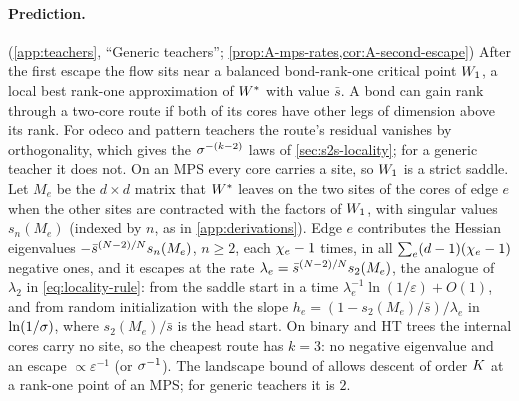 \paragraph{Prediction.}
\derived{} \newresult{} (\cref{app:teachers}, ``Generic teachers''; \cref{prop:A-mps-rates,cor:A-second-escape})
After the first escape the flow sits near a balanced bond-rank-one critical point $W_1$, a local best
rank-one approximation of $W^{*}$ with value $\bar s$. A bond can gain rank through a two-core route if both of
its cores have other legs of dimension above its rank. For odeco and pattern teachers the route's
residual vanishes by orthogonality, which gives the $\sigma^{-(k-2)}$ laws of \cref{sec:s2s-locality}; for a
generic teacher it does not. On an MPS every core carries a site, so $W_1$ is a strict saddle. Let $M_e$
be the $d\times d$ matrix that $W^{*}$ leaves on the two sites of the cores of edge $e$ when the other sites
are contracted with the factors of $W_1$, with singular values $s_n(M_e)$ (indexed by $n$, as in \cref{app:derivations}). Edge $e$ contributes the Hessian
eigenvalues $-\bar s^{(N-2)/N}s_n(M_e)$, $n\ge2$, each $\chi_{e}-1$ times, in all $\sum_e(d-1)(\chi_{e}-1)$ negative
ones, and it escapes at the rate $\lambda_e=\bar s^{(N-2)/N}s_2(M_e)$, the analogue of $\lambda_2$ in
\eqref{eq:locality-rule}: from the saddle start in a time $\lambda_e^{-1}\ln(1/\varepsilon)+O(1)$, and from random
initialization with the slope $h_e=(1-s_2(M_e)/\bar s)/\lambda_e$ in $\ln(1/\sigma)$, where $s_2(M_e)/\bar s$ is the head
start. On binary and HT trees the internal cores carry no site, so the cheapest route has $k=3$: no
negative eigenvalue and an escape $\propto\varepsilon^{-1}$ (or $\sigma^{-1}$). The landscape bound of
\citet[Lemmas~D.7--D.9]{furman2026benign} allows descent of order $K$ at a rank-one point of an MPS; for
generic teachers it is $2$.

